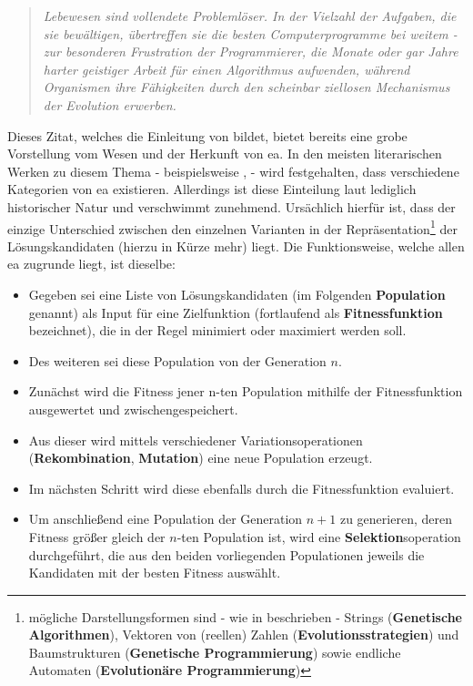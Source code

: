 		\begin{quote}
			\textit{Lebewesen sind vollendete Problemlöser. In der Vielzahl der Aufgaben, die sie bewältigen, übertreffen sie die besten Computerprogramme bei weitem - zur besonderen Frustration der Programmierer, die Monate oder gar Jahre harter geistiger Arbeit für einen Algorithmus aufwenden, während Organismen ihre Fähigkeiten durch den scheinbar ziellosen Mechanismus der Evolution erwerben. \\}
		\end{quote}
		
		Dieses Zitat, welches die Einleitung von \cite{ger-kla-kru-intro} bildet, bietet bereits eine grobe Vorstellung vom Wesen und der Herkunft von \gls{ea}. In den meisten literarischen Werken zu diesem Thema - beispielsweise \cite{ger-kla-kru-intro}, \cite{eib-smi-ea} - wird festgehalten, dass verschiedene Kategorien von \gls{ea} existieren. Allerdings ist diese Einteilung laut \cite{eib-smi-ea} lediglich historischer Natur und verschwimmt zunehmend. Ursächlich hierfür ist, dass der einzige Unterschied zwischen den einzelnen Varianten in der Repräsentation\footnote{mögliche Darstellungsformen sind - wie in \cite{eib-smi-ea} beschrieben - Strings (\textbf{Genetische Algorithmen}), Vektoren von (reellen) Zahlen (\textbf{Evolutionsstrategien}) und Baumstrukturen (\textbf{Genetische Programmierung}) sowie endliche Automaten (\textbf{Evolutionäre Programmierung})} der Lösungskandidaten (hierzu in Kürze mehr) liegt. Die Funktionsweise, welche allen \gls{ea} zugrunde liegt, ist dieselbe: \\
		
		\begin{itemize}
			\item Gegeben sei eine Liste von Lösungskandidaten (im Folgenden \textbf{Population} genannt) als Input für eine Zielfunktion (fortlaufend als \textbf{Fitnessfunktion} bezeichnet), die in der Regel minimiert oder maximiert werden soll.
			\item Des weiteren sei diese Population von der Generation $n$.
			\item Zunächst wird die Fitness jener n-ten Population mithilfe der Fitnessfunktion ausgewertet und zwischengespeichert. 
			\item Aus dieser wird mittels verschiedener Variationsoperationen (\textbf{Rekombination}, \textbf{Mutation}) eine neue Population  erzeugt.
			\item Im nächsten Schritt wird diese ebenfalls durch die Fitnessfunktion evaluiert.
			\item Um anschließend eine Population der Generation $n+1$ zu generieren, deren Fitness größer gleich der $n$-ten Population ist, wird eine \textbf{Selektion}soperation durchgeführt, die aus den beiden vorliegenden Populationen jeweils die Kandidaten mit der besten Fitness auswählt.
		\end{itemize}
		
